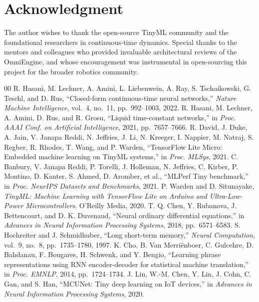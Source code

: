 \documentclass[conference]{IEEEtran}
\begin{document}
\section*{Acknowledgment}
The author wishes to thank the open-source TinyML community and the foundational researchers in continuous-time dynamics. Special thanks to the mentors and colleagues who provided invaluable architectural reviews of the OmniEngine, and whose encouragement was instrumental in open-sourcing this project for the broader robotics community.

\begin{thebibliography}{00}
 R. Hasani, M. Lechner, A. Amini, L. Liebenwein, A. Ray, S. Tschaikowski, G. Teschl, and D. Rus, ``Closed-form continuous-time neural networks,'' \textit{Nature Machine Intelligence}, vol.~4, no.~11, pp.~992--1003, 2022.
 R. Hasani, M. Lechner, A. Amini, D. Rus, and R. Grosu, ``Liquid time-constant networks,'' in \textit{Proc. AAAI Conf. on Artificial Intelligence}, 2021, pp.~7657--7666.
 R. David, J. Duke, A. Jain, V. Janapa Reddi, N. Jeffries, J. Li, N. Kreeger, I. Nappier, M. Natraj, S. Regber, R. Rhodes, T. Wang, and P. Warden, ``TensorFlow Lite Micro: Embedded machine learning on TinyML systems,'' in \textit{Proc. MLSys}, 2021.
 C. Banbury, V. Janapa Reddi, P. Torelli, J. Holleman, N. Jeffries, C. Kirber, P. Montino, D. Kanter, S. Ahmed, D. Aromber, et al., ``MLPerf Tiny benchmark,'' in \textit{Proc. NeurIPS Datasets and Benchmarks}, 2021.
 P. Warden and D. Situnayake, \textit{TinyML: Machine Learning with TensorFlow Lite on Arduino and Ultra-Low-Power Microcontrollers}. O'Reilly Media, 2020.
 T. Q. Chen, Y. Rubanova, J. Bettencourt, and D. K. Duvenaud, ``Neural ordinary differential equations,'' in \textit{Advances in Neural Information Processing Systems}, 2018, pp.~6571--6583.
 S. Hochreiter and J. Schmidhuber, ``Long short-term memory,'' \textit{Neural Computation}, vol.~9, no.~8, pp.~1735--1780, 1997.
 K. Cho, B. Van Merriënboer, C. Gulcehre, D. Bahdanau, F. Bougares, H. Schwenk, and Y. Bengio, ``Learning phrase representations using RNN encoder-decoder for statistical machine translation,'' in \textit{Proc. EMNLP}, 2014, pp.~1724--1734.
 J. Lin, W.-M. Chen, Y. Lin, J. Cohn, C. Gan, and S. Han, ``MCUNet: Tiny deep learning on IoT devices,'' in \textit{Advances in Neural Information Processing Systems}, 2020.

\end{thebibliography}
\end{document}
